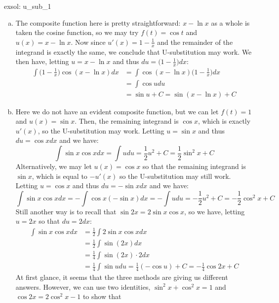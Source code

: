  \begin{exsol}[]{exsol: u_sub_1}
    \begin{enumerate}[a)]
        \item The composite function here is pretty straightforward: $x - \ln x$ as a whole is taken the cosine function, so we may try $f(t) = \cos t$ and $u(x) = x - \ln x$.  Now since $u'(x) = 1 - \frac{1}{x}$ and the remainder of the integrand is exactly the same, we conclude that U-substitution may work.  We then have, letting $u = x - \ln x$ and thus $du = \big(1-\frac{1}{x}\big)dx$:
        \begin{align*}
            \int \Big(1-\frac{1}{x}\Big) \cos(x - \ln x) dx &= \int \cos(x - \ln x) \Big(1-\frac{1}{x}\Big)dx\\
            &= \int \cos u du\\
            &= \sin u + C = \sin(x - \ln x) + C
        \end{align*}
        \item Here we do not have an evident composite function, but we can let $f(t) = 1$ and $u(x) = \sin x$.  Then, the remaining integrand is $\cos x$, which is exactly $u'(x)$, so the U-substitution may work.  Letting $u = \sin x$ and thus $du = \cos x dx$ and we have:
        \[\int \sin x \cos x dx = \int u du = \frac{1}{2} u^2 + C = \frac{1}{2} \sin^2x + C\]
        Alternatively, we may let $u(x) = \cos x$ so that the remaining integrand is $\sin x$, which is equal to $-u'(x)$ so the U-substitution may still work.  Letting $u = \cos x$ and thus $du = -\sin x dx$ and we have:
        \[\int \sin x \cos x dx = -\int \cos x (-\sin x)dx = -\int u du = -\frac{1}{2} u^2 + C = -\frac{1}{2} \cos^2x + C\]
        Still another way is to recall that $\sin 2x = 2\sin x \cos x$, so we have, letting $u = 2x$ so that $du = 2dx$:
        \begin{align*}
            \int \sin x \cos x dx &= \frac{1}{2}\int 2 \sin x \cos x dx\\
            &= \frac{1}{2} \int \sin(2x) dx\\
            &= \frac{1}{4} \int \sin(2x) \cdot 2dx\\
            &= \frac{1}{4} \int \sin u du = \frac{1}{4} (- \cos u) + C = -\frac{1}{4}\cos 2x + C
        \end{align*}
        At first glance, it seems that the three methods are giving us different answers.  However, we can use two identities, $\sin^2 x + \cos^2 x = 1$ and $\cos 2x = 2 \cos^2x - 1$ to show that
        \begin{gather*}

\end{gather*}
\end{enumerate}
\end{exsol}
